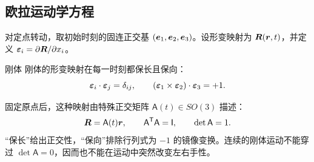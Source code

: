 \subsection{欧拉运动学方程}

对定点转动，取初始时刻的固连正交基
$(\bm{e}_1,\bm{e}_2,\bm{e}_3)$。设形变映射为 $\bm{R}(\bm{r},t)$，并定义
$\bm{\varepsilon}_i=\partial\bm{R}/\partial x_i$。

\begin{advdefinition}{刚体}\label{advA1:def:rigid-body}
刚体的形变映射在每一时刻都保长且保向：
\[
 \bm{\varepsilon}_i\cdot\bm{\varepsilon}_j=\delta_{ij},
 \qquad (\bm{\varepsilon}_1\times\bm{\varepsilon}_2)
 \cdot\bm{\varepsilon}_3=+1.
\]
\end{advdefinition}
固定原点后，这种映射由特殊正交矩阵 $\mathsf A(t)\in SO(3)$ 描述：
\[
 \bm{R}=\mathsf A(t)\bm{r},
 \qquad \mathsf A^{\mathsf T}\mathsf A=\mathsf I,
 \qquad \det\mathsf A=1.
\]
“保长”给出正交性，“保向”排除行列式为 $-1$ 的镜像变换。连续的刚体运动不能穿过 $\det\mathsf A=0$，因而也不能在运动中突然改变左右手性。

